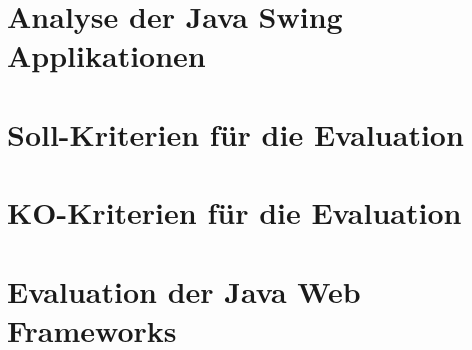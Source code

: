 \documentclass[
11pt, %
a4paper, %
BCOR25mm, %
DIV14, %
footsepline = false, %
headsepline, %
twoside, %
openright,
abstracton, %
listof=totocnumbered, %
bibliography=totocnumbered %
]{scrreprt}
\begin{document}
  

  \cleardoublepage
   
   
  \chapter{Analyse der Java Swing
  Applikationen}\label{chapter:AnalyseDerJavaSwingApplikationen}
  
  

  \cleardoublepage
  
  
  \chapter{Soll-Kriterien für die
  Evaluation}\label{chapter:SollKriterienFuerDieEvaluation}
  
   
  
  \cleardoublepage
  
  
  \chapter{KO-Kriterien für die
  Evaluation}\label{chapter:koKriterienFuerDieEvaluation}
  
   
  
  \cleardoublepage
  
  
  \chapter{Evaluation der Java Web
  Frameworks}\label{chapter:EvaluationDerJavaWebFrameworks}
  
\end{document}
